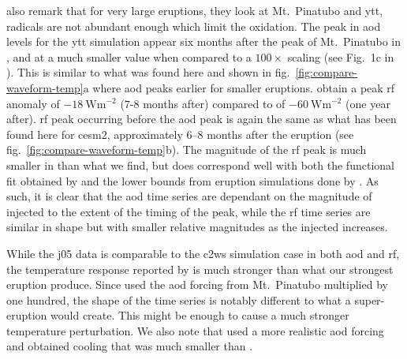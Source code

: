 \documentclass{ametsocV6.1}
\newcommand{\iso}[1][i]{{#1}njected \ce{SO2}}
\begin{document}
\citet{timmreck2010} also remark that for very large eruptions, they look at Mt.\
Pinatubo and \gls{ytt},  radicals are not abundant enough which limit the
\ce{SO2} oxidation. The peak in \gls{aod} levels for the \gls{ytt} simulation appear six
months after the peak of Mt.\ Pinatubo in \citet{timmreck2010}, and at a much smaller
value when compared to a \(100\times\) scaling (see Fig.\ 1c in \citet{timmreck2010}).
This is similar to what was found here and shown in
fig.~\ref{fig:compare-waveform-temp}a where \gls{aod} peaks earlier for smaller
eruptions. \citet{timmreck2010} obtain a peak \gls{rf} anomaly of
\(\SI{-18}{\watt\metre^{-2}}\) (\(7\)-\(8\) months after) compared to \citet{jones2005}
of \(\SI{-60}{\watt\metre^{-2}}\) (one year after). \gls{rf} peak occurring before the
\gls{aod} peak is again the same as what has been found here for \gls{cesm2},
approximately \(6\)--\(8\) months after the eruption (see
fig.~\ref{fig:compare-waveform-temp}b). The magnitude of the \gls{rf} peak is much
smaller in \citet{timmreck2010} than what we find, but does correspond well with both
the functional fit obtained by \citet{niemeier2015} and the lower bounds from eruption
simulations done by \citet{marshall2020}. As such, it is clear that the \gls{aod} time
series are dependant on the magnitude of \iso{} to the extent of the timing of the peak,
while the \gls{rf} time series are similar in shape but with smaller relative magnitudes
as the \iso{} increases.

While the \gls{j05} data is comparable to the \gls{c2ws} simulation case in both
\gls{aod} and \gls{rf}, the temperature response reported by \citet{jones2005} is much
stronger than what our strongest eruption produce. Since \citet{jones2005} used the
\gls{aod} forcing from Mt.\ Pinatubo multiplied by one hundred, the shape of the time
series is notably different to what a super-eruption would create. This might be enough
to cause a much stronger temperature perturbation. We also note that
\citet{timmreck2010} used a more realistic \gls{aod} forcing and obtained cooling that
was much smaller than \citet{jones2005}.
\end{document}
